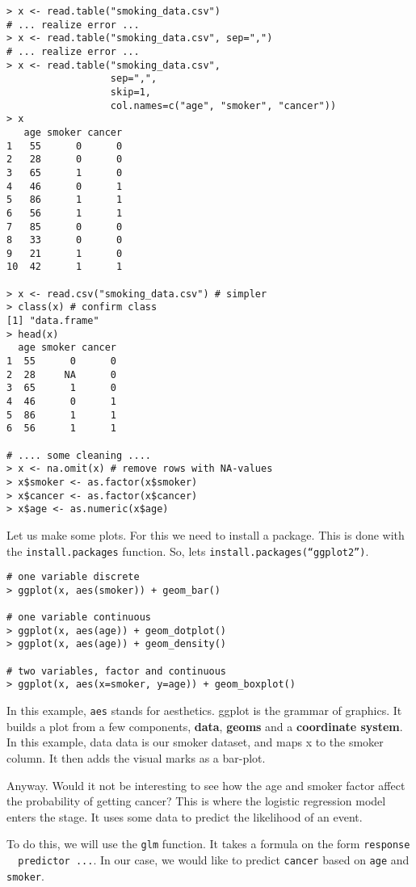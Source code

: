 \documentclass{article}[11pt]
\begin{document}
\begin{verbatim}
> x <- read.table("smoking_data.csv")
# ... realize error ...
> x <- read.table("smoking_data.csv", sep=",")
# ... realize error ...
> x <- read.table("smoking_data.csv", 
                  sep=",", 
                  skip=1, 
                  col.names=c("age", "smoker", "cancer"))
> x
   age smoker cancer
1   55      0      0
2   28      0      0
3   65      1      0
4   46      0      1
5   86      1      1
6   56      1      1
7   85      0      0
8   33      0      0
9   21      1      0
10  42      1      1

> x <- read.csv("smoking_data.csv") # simpler
> class(x) # confirm class
[1] "data.frame"
> head(x)
  age smoker cancer
1  55      0      0
2  28     NA      0
3  65      1      0
4  46      0      1
5  86      1      1
6  56      1      1

# .... some cleaning ....
> x <- na.omit(x) # remove rows with NA-values
> x$smoker <- as.factor(x$smoker)
> x$cancer <- as.factor(x$cancer)
> x$age <- as.numeric(x$age)
\end{verbatim}

Let us make some plots. For this we need to install a package. This is
done with the \texttt{install.packages} function. So, lets
\texttt{install.packages(``ggplot2'')}.


\begin{verbatim}
# one variable discrete
> ggplot(x, aes(smoker)) + geom_bar()

# one variable continuous
> ggplot(x, aes(age)) + geom_dotplot()
> ggplot(x, aes(age)) + geom_density()

# two variables, factor and continuous
> ggplot(x, aes(x=smoker, y=age)) + geom_boxplot()
\end{verbatim}

In this example, \texttt{aes} stands for aesthetics. ggplot is the
grammar of graphics. It builds a plot from a few components,
\textbf{data}, \textbf{geoms} and a \textbf{coordinate system}. In
this example, data data is our smoker dataset, and maps x to the
smoker column. It then adds the visual marks as a bar-plot.

Anyway. Would it not be interesting to see how the age and smoker
factor affect the probability of getting cancer? This is where the
logistic regression model enters the stage. It uses some data to
predict the likelihood of an event.

To do this, we will use the \texttt{glm} function. It takes a formula
on the form \texttt{response ~ predictor ...}. In our case, we would
like to predict \texttt{cancer} based on \texttt{age} and
\texttt{smoker}.
\end{document}
